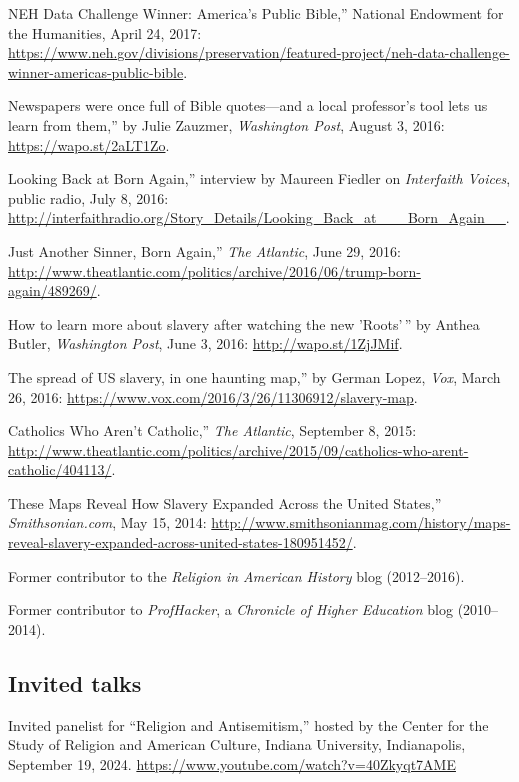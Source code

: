 \documentclass[11pt]{article}
\begin{document}
\noindent{}NEH Data Challenge Winner: America's Public Bible,'' National Endowment for the Humanities, April 24, 2017: \url{https://www.neh.gov/divisions/preservation/featured-project/neh-data-challenge-winner-americas-public-bible}.

\noindent{}Newspapers were once full of Bible quotes---and a local professor's tool lets us learn from them,'' by Julie Zauzmer, \emph{Washington Post}, August 3, 2016: \url{https://wapo.st/2aLT1Zo}.

\noindent{}Looking Back at Born Again,'' interview by Maureen Fiedler on \emph{Interfaith Voices}, public radio, July 8, 2016: \url{http://interfaithradio.org/Story_Details/Looking_Back_at___Born_Again__}.

\noindent{}Just Another Sinner, Born Again,'' \emph{The Atlantic}, June 29, 2016: \url{http://www.theatlantic.com/politics/archive/2016/06/trump-born-again/489269/}.

\noindent{}How to learn more about slavery after watching the new 'Roots'\,'' by Anthea Butler, \emph{Washington Post}, June 3, 2016: \url{http://wapo.st/1ZjJMif}.

\noindent{}The spread of US slavery, in one haunting map,'' by German Lopez, \emph{Vox}, March 26, 2016: \url{https://www.vox.com/2016/3/26/11306912/slavery-map}.

\noindent{}Catholics Who Aren't Catholic,'' \emph{The Atlantic}, September 8, 2015:  \url{http://www.theatlantic.com/politics/archive/2015/09/catholics-who-arent-catholic/404113/}.

\noindent{}These Maps Reveal How Slavery Expanded Across the United States,'' \emph{Smithsonian.com}, May 15, 2014: \url{http://www.smithsonianmag.com/history/maps-reveal-slavery-expanded-across-united-states-180951452/}.

Former contributor to the \emph{Religion in American History} blog (2012--2016).

Former contributor to \emph{ProfHacker}, a \emph{Chronicle of Higher Education} blog (2010--2014). 

\subsection{Invited talks}\label{Invited talks}

Invited panelist for ``Religion and Antisemitism,'' hosted by the Center for the Study of Religion and American Culture, Indiana University, Indianapolis, September 19, 2024. \url{https://www.youtube.com/watch?v=40Zkyqt7AME}
\end{document}
